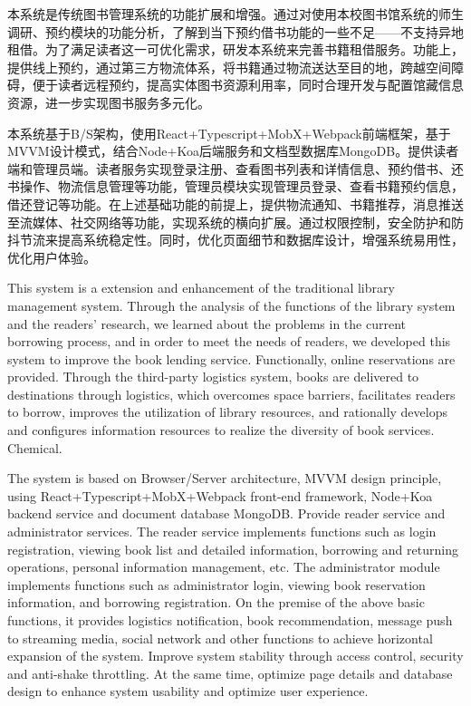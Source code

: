 
\begin{CHSabstract}
	本系统是传统图书管理系统的功能扩展和增强。通过对使用本校图书馆系统的师生调研、预约模块的功能分析，了解到当下预约借书功能的一些不足——不支持异地租借。为了满足读者这一可优化需求，研发本系统来完善书籍租借服务。功能上，提供线上预约，通过第三方物流体系，将书籍通过物流送达至目的地，跨越空间障碍，便于读者远程预约，提高实体图书资源利用率，同时合理开发与配置馆藏信息资源，进一步实现图书服务多元化。

	本系统基于B/S架构，使用React+Typescript+MobX+Webpack前端框架，基于MVVM设计模式，结合Node+Koa后端服务和文档型数据库MongoDB。提供读者端和管理员端。读者服务实现登录注册、查看图书列表和详情信息、预约借书、还书操作、物流信息管理等功能，管理员模块实现管理员登录、查看书籍预约信息，借还登记等功能。在上述基础功能的前提上，提供物流通知、书籍推荐，消息推送至流媒体、社交网络等功能，实现系统的横向扩展。通过权限控制，安全防护和防抖节流来提高系统稳定性。同时，优化页面细节和数据库设计，增强系统易用性，优化用户体验。
\end{CHSabstract}
\begin{ENGabstract}
This system is a extension and enhancement of the traditional library management system. Through the analysis of the functions of the library system and the readers' research, we learned about the problems in the current borrowing process, and in order to meet the needs of readers, we developed this system to improve the book lending service. Functionally, online reservations are provided. Through the third-party logistics system, books are delivered to destinations through logistics, which overcomes space barriers, facilitates readers to borrow, improves the utilization of library resources, and rationally develops and configures information resources to realize the diversity of book services. Chemical.

The system is based on Browser/Server architecture, MVVM design principle, using React+Typescript+MobX+Webpack front-end framework, Node+Koa backend service and document database MongoDB. Provide reader service and administrator services. The reader service implements functions such as login registration, viewing book list and detailed information, borrowing and returning operations, personal information management, etc. The administrator module implements functions such as administrator login, viewing book reservation information, and borrowing registration. On the premise of the above basic functions, it provides logistics notification, book recommendation, message push to streaming media, social network and other functions to achieve horizontal expansion of the system. Improve system stability through access control, security and anti-shake throttling. At the same time, optimize page details and database design to enhance system usability and optimize user experience.
\end{ENGabstract}
